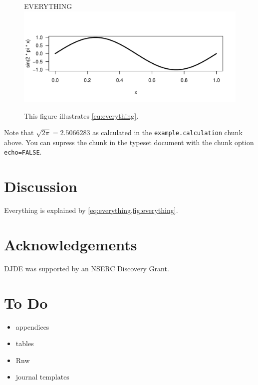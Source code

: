 \documentclass[12pt]{article}\usepackage[]{graphicx}\usepackage[]{xcolor}
\makeatletter
\def\maxwidth{ %
  \ifdim\Gin@nat@width>\linewidth
    \linewidth
  \else
    \Gin@nat@width
  \fi
}
\newenvironment{knitrout}{}{} %
\makeatother
\begin{document}
\begin{figure}
  \begin{center}
    \Huge EVERYTHING
\begin{knitrout}
\color{fgcolor}
\includegraphics[width=\maxwidth]{figure/example.figure-1} 
\end{knitrout}
  \end{center}
  \caption{This figure illustrates \cref{eq:everything}.}
  \label{fig:everything}
\end{figure}

Note that $\sqrt{2\pi}=2.5066283$ as calculated in the 
\texttt{example.calculation} chunk above.  You can supress
the chunk in the typeset document with the chunk option
\texttt{echo=FALSE}.

\section{Discussion}\label{sec:discussion}

Everything is explained by \cref{eq:everything,fig:everything}.

\section*{Acknowledgements}

DJDE was supported by an NSERC Discovery Grant.







\appendix

\section{To Do}\label{app:ToDo}

\begin{itemize}
\item appendices
\item tables
\item Rnw
\item journal templates
\end{itemize}
\end{document}
